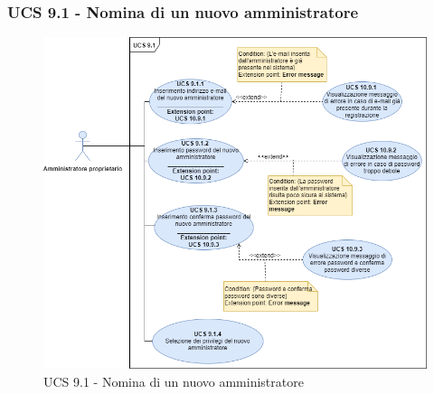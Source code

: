 \subsubsection{UCS 9.1 - Nomina di un nuovo amministratore}%
\begin{figure}[h]
  \centering
    \includegraphics[scale=0.5]{Sezioni/UseCase/Immagini/UCS9.1.png}
  \caption{UCS 9.1 - Nomina di un nuovo amministratore}
\end{figure}

